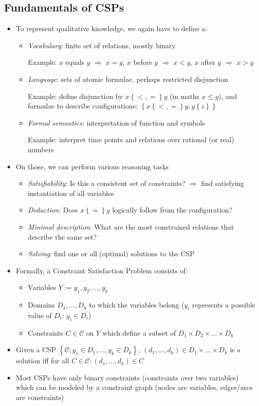 \subsection{Fundamentals of CSPs}
\begin{itemize}
	\item To represent qualitative knowledge, we again have to define a:
	\begin{itemize}
		\item \textit{Vocabulary}: finite set of relations, mostly binary. 
		
		Example: $x$ equals $y$ $\Rightarrow$ $x=y$, $x$ before $y$ $\Rightarrow$  $x<y$, $x$ after $y$ $\Rightarrow$  $x>y$
		\item \textit{Language}: sets of atomic formulae, perhaps restricted disjunction
		
		Example: define disjunction by $x\left\{<,=\right\}y$ (in maths $x\leq y$), and formulae to describe configurations: $\left\{x\left\{<,=\right\}y, y\left\{z\right\}\right\}$
		\item \textit{Formal semantics}: interpretation of function and symbols
		
		Example: interpret time points and relations over rational (or real) numbers
	\end{itemize}
	\item On those, we can perform various reasoning tasks
	\begin{itemize}
		\item \textit{Satisfiability}: Is this a consistent set of constraints? $\Rightarrow$ find satisfying instantiation of all variables
		\item \textit{Deduction}: Does $x\left\{=\right\}y$ logically follow from the configuration?
		\item \textit{Minimal description}: What are the most constrained relations that describe the same set? 
		\item \textit{Solving}: find one or all (optimal) solutions to the CSP
	\end{itemize}
	\item Formally, a Constraint Satisfaction Problem consists of:
	\begin{itemize}
		\item Variables $Y:=y_1, y_2, ..., y_k$
		\item Domains $D_1, ..., D_k$ to which the variables belong ($y_i$ represents a possible value of $D_i$: $y_i\in D_i$)
		\item Constraints $C\in \mathcal{C}$ on $Y$ which define a subset of $D_1 \times D_2 \times ... \times D_k$ 
	\end{itemize}
	\item Given a CSP $\left\{\mathcal{C}; y_1\in D_1, ..., y_k\in D_k \right\}$, $\left(d_1, ..., d_k\right)\in D_1\times ...\times D_k$ is a solution iff for all $C\in \mathcal{C}: \left(d_1, ..., d_k\right)\in C$
	\item Most CSPs have only binary constraints (constraints over two variables) which can be modeled by a constraint graph (nodes are variables, edges/arcs are constraints)
\end{itemize}
